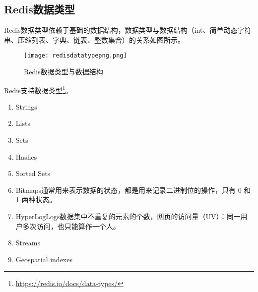 \documentclass[../../../interview-questions.tex]{subfiles}
\begin{document}
\subsection{Redis数据类型}

Redis数据类型依赖于基础的数据结构，数据类型与数据结构（int、简单动态字符串、压缩列表、字典、链表、整数集合）的关系如图所示。

\begin{figure}[htbp]
	\centering
	\texttt{[image: redisdatatypepng.png]}
	\caption{Redis数据类型与数据结构}
	\label{fig:redisdatatypepng}
\end{figure}

Redis支持数据类型\footnote{\url{https://redis.io/docs/data-types/}}。

\begin{enumerate}
    \item {Strings}
    \item {Lists}
    \item {Sets}
    \item {Hashes}
    \item {Sorted Sets}
    \item {Bitmaps}通常用来表示数据的状态，都是用来记录二进制位的操作，只有 0 和 1 两种状态。
    \item {HyperLogLogs}数据集中不重复的元素的个数，网页的访问量（UV）：同一用户多次访问，也只能算作一个人。
    \item {Streams}
    \item {Geospatial indexes}
\end{enumerate}
\end{document}
